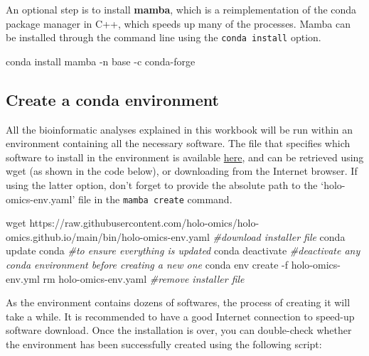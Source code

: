 \documentclass[
]{book}
\newenvironment{Shaded}{\begin{snugshade}}{\end{snugshade}}
\newcommand{\AttributeTok}[1]{\textcolor[rgb]{0.77,0.63,0.00}{#1}}
\newcommand{\CommentTok}[1]{\textcolor[rgb]{0.56,0.35,0.01}{\textit{#1}}}
\newcommand{\ExtensionTok}[1]{#1}
\newcommand{\FunctionTok}[1]{\textcolor[rgb]{0.00,0.00,0.00}{#1}}
\newcommand{\NormalTok}[1]{#1}
\begin{document}
An optional step is to install \textbf{mamba}, which is a reimplementation of the conda package manager in C++, which speeds up many of the processes. Mamba can be installed through the command line using the \texttt{conda\ install} option.

\begin{Shaded}
\begin{Highlighting}[]
\ExtensionTok{conda}\NormalTok{ install mamba }\AttributeTok{{-}n}\NormalTok{ base }\AttributeTok{{-}c}\NormalTok{ conda{-}forge}
\end{Highlighting}
\end{Shaded}

\hypertarget{create-conda-environment}{%
\subsection*{Create a conda environment}\label{create-conda-environment}}

All the bioinformatic analyses explained in this workbook will be run within an environment containing all the necessary software. The file that specifies which software to install in the environment is available \href{https://raw.githubusercontent.com/holo-omics/holo-omics.github.io/main/bin/holo-omics-env.yaml}{here}, and can be retrieved using wget (as shown in the code below), or downloading from the Internet browser. If using the latter option, don't forget to provide the absolute path to the `holo-omics-env.yaml' file in the \texttt{mamba\ create} command.

\begin{Shaded}
\begin{Highlighting}[]
\FunctionTok{wget}\NormalTok{ https://raw.githubusercontent.com/holo{-}omics/holo{-}omics.github.io/main/bin/holo{-}omics{-}env.yaml }\CommentTok{\#download installer file}
\ExtensionTok{conda}\NormalTok{ update conda }\CommentTok{\#to ensure everything is updated}
\ExtensionTok{conda}\NormalTok{ deactivate }\CommentTok{\#deactivate any conda environment before creating a new one}
\ExtensionTok{conda}\NormalTok{ env create }\AttributeTok{{-}f}\NormalTok{ holo{-}omics{-}env.yml}
\FunctionTok{rm}\NormalTok{ holo{-}omics{-}env.yaml }\CommentTok{\#remove installer file}
\end{Highlighting}
\end{Shaded}

As the environment contains dozens of softwares, the process of creating it will take a while. It is recommended to have a good Internet connection to speed-up software download. Once the installation is over, you can double-check whether the environment has been successfully created using the following script:
\end{document}
